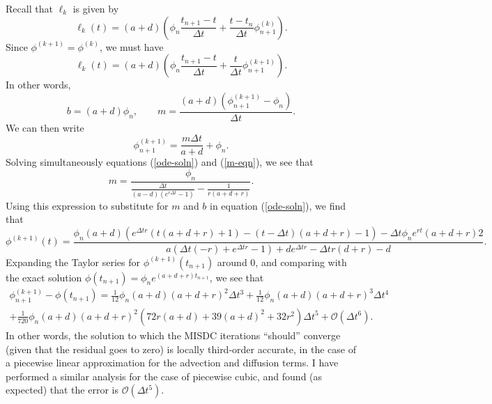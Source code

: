 \documentclass[12pt]{article}
\begin{document}
Recall that $\ell_k$ is given by
\begin{equation}
   \ell_k(t) = (a+d)\left(\phi_n\frac{t_{n+1}-t}{\Delta t} 
                        + \frac{t-t_n}{\Delta t}\phi^{(k)}_{n+1} \right).
\end{equation}
Since $\phi^{(k+1)} = \phi^{(k)}$, we must have
\begin{equation}
   \ell_k(t) = (a+d)\left(\phi_n\frac{t_{n+1}-t}{\Delta t} 
                        + \frac{t}{\Delta t}\phi^{(k+1)}_{n+1} \right).
\end{equation}
In other words,
\begin{equation}
   b= (a+d)\phi_n,\qquad
   m= \frac{(a+d)\left(\phi^{(k+1)}_{n+1} - \phi_n\right)}{\Delta t}.
\end{equation}
We can then write
\begin{equation}
   \label{m-eqn}
   \phi^{(k+1)}_{n+1} = \frac{m \Delta t}{a+d} + \phi_n.
\end{equation}
Solving simultaneously equations (\ref{ode-soln}) and (\ref{m-eqn}), we see 
that
\begin{equation}
   m = \frac{\phi_n}{\frac{\Delta t}{(a-d)(e^{r\Delta t} -1)} - \frac{1}{r(a+d+r)}}.
\end{equation}
Using this expression to substitute for $m$ and $b$ in equation (\ref{ode-soln}), 
we find that
\begin{equation}
   \phi^{(k+1)}(t) = \frac{\phi_n (a+d) \left(e^{\Delta t r} 
      (t (a+d+r)+1)-(t-\Delta t) (a+d+r)-1\right)-\Delta t 
      \phi_n e^{r t} (a+d+r)2}{a \left(\Delta t (-r)+e^{\Delta t r}-1\right)+d e^{\Delta t r}-\Delta t r (d+r)-d} .
\end{equation}
Expanding the Taylor series for $\phi^{(k+1)}(t_{n+1})$ around $0$, and 
comparing with the exact solution $\phi(t_{n+1}) = \phi_n e^{(a+d+r)t_{n+1}}$, 
we see that
\begin{multline}
   \phi^{(k+1)}_{n+1} - \phi(t_{n+1}) = \frac{1}{12} \phi_n (a+d) (a+d+r)^2 \Delta t^3 + \frac{1}{12} \phi_n (a+d) (a+d+r)^3 \Delta t^4 \\
      +\frac{1}{720} \phi_n (a+d) (a+d+r)^2 \left(72 r (a+d)+39 (a+d)^2+32 r^2\right) \Delta t^5
      + \mathcal{O}(\Delta t^6).
\end{multline}
In other words, the solution to which the MISDC iterations ``should'' converge 
(given that the residual goes to zero) is locally third-order accurate, 
in the case of a piecewise linear approximation for the advection and diffusion 
terms. I have performed a similar analysis for the case of piecewise cubic, and 
found (as expected) that the error is $\mathcal{O}(\Delta t^5)$.
\end{document}
